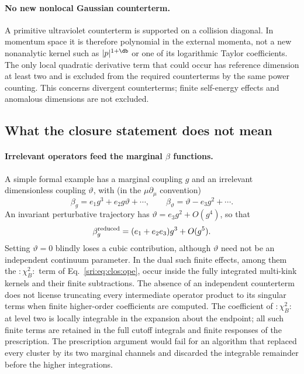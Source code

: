 \paragraph{No new nonlocal Gaussian counterterm.} A primitive ultraviolet counterterm is supported on a collision
diagonal. In momentum space it is therefore polynomial in the external momenta, not a new nonanalytic kernel such as
$|p|^{1+\db}$ or one of its logarithmic Taylor coefficients. The only local quadratic derivative term that could occur
has reference dimension at least two and is excluded from the required counterterms by the same power counting. This
concerns divergent counterterms; finite self-energy effects and anomalous dimensions are not excluded.

\subsection{What the closure statement does not mean}\label{sri:app:clos:notmean}
\paragraph{Irrelevant operators feed the marginal \texorpdfstring{$\beta$}{beta} functions.} A simple formal example has
a marginal coupling $g$ and an irrelevant dimensionless coupling $\vartheta$, with (in the $\mu\partial_\mu$
convention)
\begin{equation}
 \beta_g=e_1g^3+e_2g\vartheta+\cdots,\qquad \beta_\vartheta=\vartheta-e_3g^2+\cdots .
\end{equation}
An invariant perturbative trajectory has $\vartheta=e_3g^2+O(g^4)$, so that
\begin{equation}
 \beta_g^{\rm reduced}=(e_1+e_2e_3)g^3+O(g^5).
\end{equation}
Setting $\vartheta=0$ blindly loses a cubic contribution, although $\vartheta$ need not be an independent continuum
parameter. In the dual such finite effects, among them the ${:}\chi_B^2{:}$ term of Eq.~\eqref{sri:eq:clos:ope}, occur inside
the fully integrated multi-kink kernels and their finite subtractions. The absence of an independent counterterm does
not license truncating every intermediate operator product to its singular terms when finite higher-order coefficients
are computed. The coefficient of ${:}\chi_B^2{:}$ at level two is locally integrable in the expansion about the
endpoint; all such finite terms are retained in the full cutoff integrals and finite responses of the prescription.
The prescription argument would fail for an algorithm that replaced every cluster by its two marginal channels and
discarded the integrable remainder before the higher integrations.

